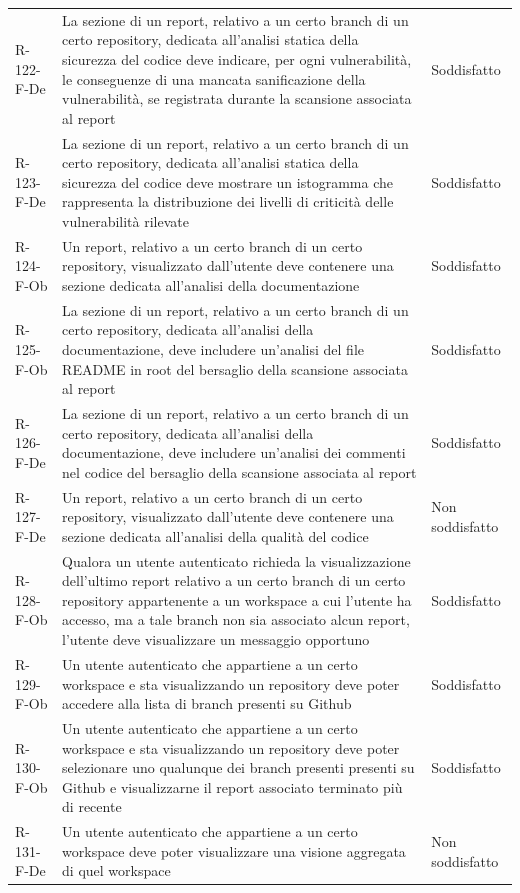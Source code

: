 \documentclass[a4paper, 11pt]{article}
\begin{document}
\begin{longtable}[c]{ >{\centering\arraybackslash}m{2.5cm} >{\centering\arraybackslash}m{8.3cm} >{\centering\arraybackslash}m{3.5cm} }
R-122-F-De & La sezione di un report, relativo a un certo branch di un certo repository, dedicata all'analisi statica della sicurezza del codice deve indicare, per ogni vulnerabilità, le conseguenze di una mancata sanificazione della vulnerabilità, se registrata durante la scansione associata al report & Soddisfatto\\
R-123-F-De & La sezione di un report, relativo a un certo branch di un certo repository, dedicata all'analisi statica della sicurezza del codice deve mostrare un istogramma che rappresenta la distribuzione dei livelli di criticità delle vulnerabilità rilevate & Soddisfatto\\
R-124-F-Ob & Un report, relativo a un certo branch di un certo repository, visualizzato dall'utente deve contenere una sezione dedicata all'analisi della documentazione & Soddisfatto\\
R-125-F-Ob & La sezione di un report, relativo a un certo branch di un certo repository, dedicata all'analisi della documentazione, deve includere un'analisi del file README in root del bersaglio della scansione associata al report & Soddisfatto\\
R-126-F-De & La sezione di un report, relativo a un certo branch di un certo repository, dedicata all'analisi della documentazione, deve includere un'analisi dei commenti nel codice del bersaglio della scansione associata al report & Soddisfatto\\
R-127-F-De & Un report, relativo a un certo branch di un certo repository, visualizzato dall'utente deve contenere una sezione dedicata all'analisi della qualità del codice & Non soddisfatto\\
R-128-F-Ob & Qualora un utente autenticato richieda la visualizzazione dell'ultimo report relativo a un certo branch di un certo repository appartenente a un workspace a cui l'utente ha accesso, ma a tale branch non sia associato alcun report, l'utente deve visualizzare un messaggio opportuno & Soddisfatto\\
R-129-F-Ob & Un utente autenticato che appartiene a un certo workspace e sta visualizzando un repository deve poter accedere alla lista di branch presenti su Github & Soddisfatto\\
R-130-F-Ob & Un utente autenticato che appartiene a un certo workspace e sta visualizzando un repository deve poter selezionare uno qualunque dei branch presenti presenti su Github e visualizzarne il report associato terminato più di recente & Soddisfatto\\
R-131-F-De & Un utente autenticato che appartiene a un certo workspace deve poter visualizzare una visione aggregata di quel workspace & Non soddisfatto\\

\end{longtable}
\end{document}

